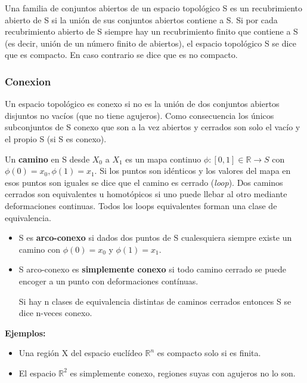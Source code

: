 \documentclass{article}
\begin{document}
Una familia de conjuntos abiertos de un espacio topológico S es un recubrimiento abierto de S si la unión de sus conjuntos abiertos contiene a S. Si por cada recubrimiento abierto de S siempre hay un recubrimiento finito que contiene a S (es decir, unión de un número finito de abiertos), el espacio topológico S se dice que es compacto. En caso contrario se dice que es no compacto.

\subsubsection{Conexion}

Un espacio topológico es conexo si no es la unión de dos conjuntos abiertos disjuntos no vacíos (que no tiene agujeros). Como consecuencia los únicos subconjuntos de S conexo que son a la vez abiertos y cerrados son solo el vacío y el propio S (si S es conexo).

\smallskip
Un \textbf{camino} en S desde $X_0$ a $X_1$  es un mapa continuo  $\phi: [0,1]\in \mathds{R}\to S$ con $\phi (0)=x_0,\phi (1)=x_1$. Si los puntos son idénticos y los valores del mapa en esos puntos son iguales se dice que el camino es cerrado (\textit{loop}). Dos caminos cerrados son equivalentes u homotópicos si uno puede llebar al otro mediante deformaciones continuas. Todos los loops equivalentes forman una clase de equivalencia.

\begin{itemize}
    \item S es \textbf{arco-conexo} si dados dos puntos de S cualesquiera siempre existe un camino con $\phi (0)=x_0$ y $\phi (1)=x_1$.
    
    \item S arco-conexo es \textbf{simplemente conexo} si todo camino cerrado se puede encoger a un punto con deformaciones contínuas.
    
    Si hay n clases de equivalencia distintas de caminos cerrados entonces S se dice n-veces conexo.
\end{itemize}

\textbf{Ejemplos:}

\begin{itemize}
    \item Una región X del espacio euclídeo $\mathds{R}^n$ es compacto solo si es finita.
    \item El espacio $\mathds{R}^2$ es simplemente conexo, regiones suyas con agujeros no lo son.
\end{itemize}
 
\end{document}
